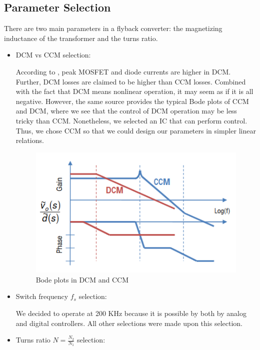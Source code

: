 \documentclass[12pt]{article}
\begin{document}
    \subsection{Parameter Selection}

    There are two main parameters in a flyback converter: the magnetizing inductance of the transformer and the turns ratio.

    \begin{itemize}

        \item DCM vs CCM selection:

        According to \cite{dcm}, peak MOSFET and diode currents are higher in DCM. Further, DCM losses are claimed to be higher than CCM losses. Combined with the fact that DCM means nonlinear operation, it may seem as if it is all negative. However, the same source provides the typical Bode plots of CCM and DCM, where we see that the control of DCM operation may be less tricky than CCM. Nonetheless, we selected an IC that can perform control. Thus, we chose CCM so that we could design our parameters in simpler linear relations.

        \begin{figure}[H]
            \centering
            \includegraphics[scale=0.8]{img/bode.png}
            \caption{Bode plots in DCM and CCM}
            \label{fig:bode}
        \end{figure}

        \item Switch frequency $f_s$ selection:

        We decided to operate at 200 KHz because it is possible by both by analog and digital controllers. All other selections were made upon this selection.
        
        \item Turns ratio $N = \frac{N_2}{N_1}$ selection:


\end{itemize}
\end{document}
